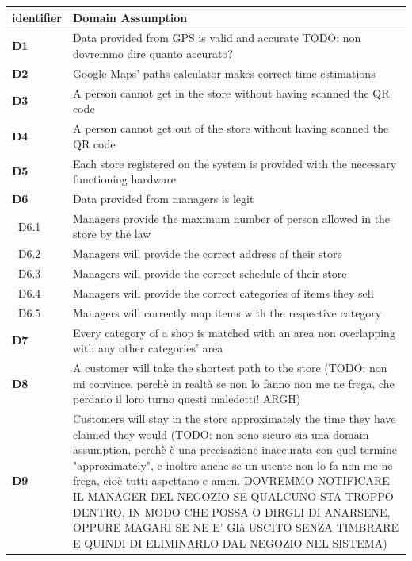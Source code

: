 \begin{table}[h!]
    \centering
    \begin{tabular}{@{}P{0.1\textwidth}P{0.80\textwidth}@{}}
        \toprule
        \textbf{identifier}& \textbf{Domain Assumption}\\
        \midrule
        \textbf{D1}        & Data provided from GPS is valid and accurate TODO: non dovremmo dire quanto accurato?\\
        \textbf{D2}        & Google Maps' paths calculator makes correct time estimations\\
        \textbf{D3}        & A person cannot get in the store without having scanned the QR code\\
        \textbf{D4}        & A person cannot get out of the store without having scanned the QR code\\
        \textbf{D5}        & Each store registered on the system is provided with the necessary functioning hardware\\
        \textbf{D6}        & Data provided from managers is legit\\
        $\;\;$D6.1         & Managers provide the maximum number of person allowed in the store by the law\\
        $\;\;$D6.2         & Managers will provide the correct address of their store\\
        $\;\;$D6.3         & Managers will provide the correct schedule of their store\\
        $\;\;$D6.4         & Managers will provide the correct categories of items they sell\\
        $\;\;$D6.5         & Managers will correctly map items with the respective category\\
        \textbf{D7}        & Every category of a shop is matched with an area non overlapping with any other categories' area\\
        \textbf{D8}        & A customer will take the shortest path to the store (TODO: non mi convince, perchè in realtà se non lo fanno non me ne frega, che perdano il loro turno questi maledetti! ARGH)\\
        \textbf{D9}        & Customers will stay in the store approximately the time they have claimed they would (TODO: non sono sicuro sia una domain assumption, perchè è una precisazione inaccurata con quel termine "approximately", e inoltre anche se un utente non lo fa non me ne frega, cioè tutti aspettano e amen. DOVREMMO NOTIFICARE IL MANAGER DEL NEGOZIO SE QUALCUNO STA TROPPO DENTRO, IN MODO CHE POSSA O DIRGLI DI ANARSENE, OPPURE MAGARI SE NE E' GIà USCITO SENZA TIMBRARE E QUINDI DI ELIMINARLO DAL NEGOZIO NEL SISTEMA)\\

\end{tabular}
\end{table}
